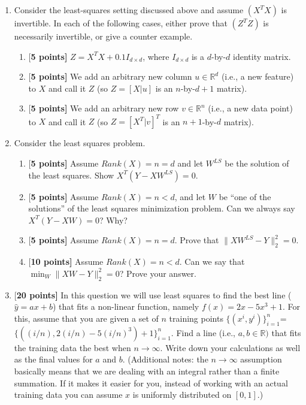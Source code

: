 \documentclass{article}
\begin{document}
\begin{enumerate}

\item Consider the least-squares setting discussed above and assume $(X^TX)$ is invertible. In each of the following cases, either prove that $(Z^TZ)$ is necessarily invertible, or give a counter example.

\begin{enumerate}
    \item {[\bf 5 points]} $Z = X^TX + 0.1 I_{d\times d}$, where $I_{d\times d}$ is a $d$-by-$d$ identity matrix.
    \item {[\bf 5 points]} We add an arbitrary new column $u\in \mathbb{R}^d$ (i.e., a new feature) to $X$ and call it $Z$ (so $Z=[X | u ]$ is an $n$-by-$d+1$ matrix).
    \item {[\bf 5 points]} We add an arbitrary new row $v\in \mathbb{R}^n$ (i.e., a new data point) to $X$ and call it $Z$ (so $Z=[X^T | v ]^T$ is an $n+1$-by-$d$ matrix).
\end{enumerate}


     \item Consider the least squares problem. 
     \begin{enumerate}
         \item {[\bf 5 points]} Assume $Rank(X)=n=d$ and let $W^{LS}$ be the solution of the least squares. Show $X^T(Y-XW^{LS})=0$.
         \item {[\bf 5 points]} Assume $Rank(X)=n<d$, and let $W$ be ``one of the solutions'' of the least squares minimization problem. Can we always say $X^T(Y-XW)=0$? Why?
         \item {[\bf 5 points]} Assume $Rank(X)=n=d$. Prove that $\|XW^{LS}-Y\|_2^2=0$.
         \item {[\bf 10 points]} Assume $Rank(X)=n<d$. Can we say that $\min_{W}\|XW-Y\|_2^2=0$? Prove your answer.
     \end{enumerate}
     
     
    \item {[\bf 20 points]} In this question we will use least squares to find the best line ($\hat{y}=ax+b$) that fits a non-linear function, namely $f(x)=2x-5x^3+1$. For this, assume that you are given a set of $n$ training points $\{(x^i,y^i)\}_{i=1}^{n}$=$\{((i/n), 2(i/n) - 5(i/n)^3)+1\}_{i=1}^{n}$. Find a line (i.e., $a,b\in \mathbb{R})$ that fits the training data the best when $n\rightarrow \infty$. Write down your calculations as well as the final values for $a$ and $b$.
    (Additional notes: the $n\rightarrow \infty$ assumption basically means that we are dealing with an integral rather than a finite summation. If it makes it easier for you, instead of working with an actual training data you can assume $x$ is uniformly distributed on $[0,1]$.)
    

\end{enumerate}
\end{document}
